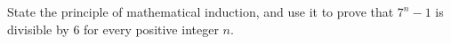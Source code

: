 State the principle of mathematical induction, and use it to prove that $7^n-1$ is divisible by $6$ for every positive integer $n$.

